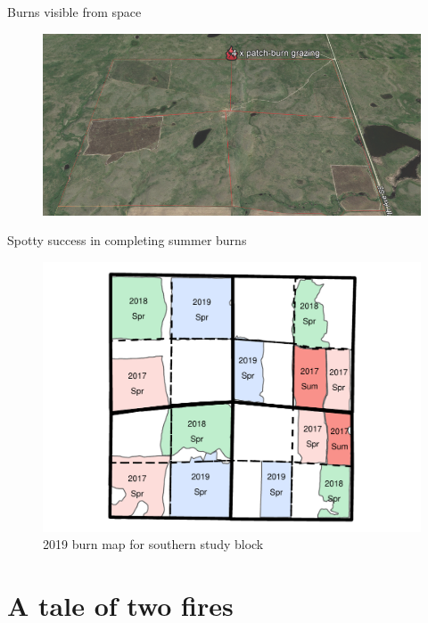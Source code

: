 \documentclass[11pt]{beamer}
\begin{document}
\begin{frame}{Burns visible from space}
	\begin{center}
		\begin{figure}
			\includegraphics[width=1\linewidth]{figs/BobSWBurnedOutline2} 
		\end{figure}
	\end{center}
\end{frame}

\begin{frame}{Spotty success in completing summer burns}

	\begin{center}
		\begin{figure}
			\includegraphics[width=0.9\linewidth]{figs/BarkerBurns-1} 
			\caption{2019 burn map for southern study block}
		\end{figure}
	\end{center}
\end{frame}

\section{A tale of two fires}
\end{document}
